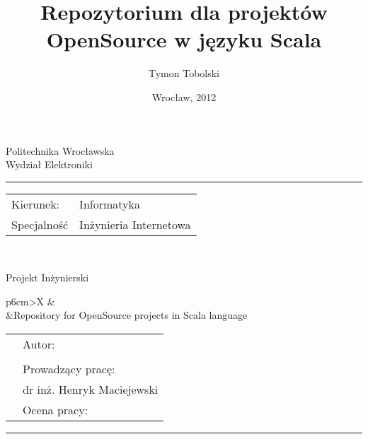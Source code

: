 \documentclass[a4paper,onecolumn,oneside,12pt]{memoir}
\makeatletter
\newcommand\uczelnia[1]{\renewcommand\@uczelnia{#1}}
\newcommand\@uczelnia{}
\newcommand\wydzial[1]{\renewcommand\@wydzial{#1}}
\newcommand\@wydzial{}
\newcommand\kierunek[1]{\renewcommand\@kierunek{#1}}
\newcommand\@kierunek{}
\newcommand\specjalnosc[1]{\renewcommand\@specjalnosc{#1}}
\newcommand\@specjalnosc{}
\newcommand\titleEN[1]{\renewcommand\@titleEN{#1}}
\newcommand\@titleEN{}
\newcommand\promotor[1]{\renewcommand\@promotor{#1}}
\newcommand\@promotor{}
\def\maketitle{%
  \null
  \pagestyle{empty}%
  {\centering\vspace{-1cm}
    {\fontsize{22pt}{24pt}\selectfont \@uczelnia}\\[0.4cm]
    {\fontsize{22pt}{24pt}\selectfont \@wydzial }\\[0.5cm]
    \hrule \vspace*{0.7cm}
  }
{\flushleft\fontsize{14pt}{16pt}\selectfont%
\begin{tabular}{ll}
Kierunek: & \@kierunek\\
Specjalność & \@specjalnosc\\
\end{tabular}\\[1.3cm]
}
{\centering
{\fontsize{24pt}{26pt}\selectfont Projekt Inżynierski}\\[1.5cm]
}
%
\begin{tabularx}{\linewidth}{p{6cm}>{\centering\arraybackslash}X}
    &{\fontsize{16pt}{18pt}\selectfont \@title}\\[5mm]  %
    &{\fontsize{16pt}{18pt}\selectfont \@titleEN}\\[10mm] %
\end{tabularx}
\vfill
\begin{tabularx}{\linewidth}{p{6cm}l}
    &{\fontsize{16pt}{18pt}\selectfont Autor:}\\[5mm]
    &{\fontsize{14pt}{16pt}\selectfont \@author}\\[10mm]
    &{\fontsize{16pt}{18pt}\selectfont Prowadzący pracę:}\\[5mm]
    &{\fontsize{14pt}{16pt}\selectfont \@promotor}\\[10mm]
    &{\fontsize{16pt}{18pt}\selectfont Ocena pracy:}\\[20mm]
  \end{tabularx}
\hrule\vspace*{0.3cm}
{\centering
{\fontsize{16pt}{18pt}\selectfont \@date}\\[0cm]
}
\normalfont
 \cleardoublepage
}
\makeatother
\begin{document}
\title{Repozytorium dla projektów OpenSource w języku Scala}
\titleEN{Repository for OpenSource projects in Scala language}
\author{Tymon Tobolski}
\uczelnia{Politechnika Wrocławska}
\wydzial{Wydział Elektroniki}
\kierunek{Informatyka}
\specjalnosc{Inżynieria Internetowa}
\promotor{dr inż. Henryk Maciejewski}
\date{Wrocław, 2012}
\maketitle

\pagestyle{outer}


\nocite{*}
\end{document}

